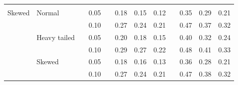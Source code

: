 \documentclass[12pt]{article} %
\begin{document}
\begin{table}[ht]
\begin{scriptsize}
\begin{center}
\begin{tabular}{ll p{.1cm} c p{.1cm} rrr p{.1cm} rrr}
             &&&&&&&&&&&\\
Skewed       & Normal       && 0.05 &&  0.18 & 0.15 & 0.12 && 0.35 & 0.29 & 0.21 \\ 
             &              && 0.10 &&  0.27 & 0.24 & 0.21 && 0.47 & 0.37 & 0.32 \\ 
             & Heavy tailed && 0.05 &&  0.20 & 0.18 & 0.15 && 0.40 & 0.32 & 0.24 \\ 
             &              && 0.10 &&  0.29 & 0.27 & 0.22 && 0.48 & 0.41 & 0.33 \\ 
             & Skewed       && 0.05 &&  0.18 & 0.16 & 0.13 && 0.36 & 0.28 & 0.21 \\ 
             &              && 0.10 &&  0.27 & 0.24 & 0.21 && 0.47 & 0.38 & 0.32 \\ 

\hline
\end{tabular}
\end{center}
\end{scriptsize}
\end{table}
\end{document}
